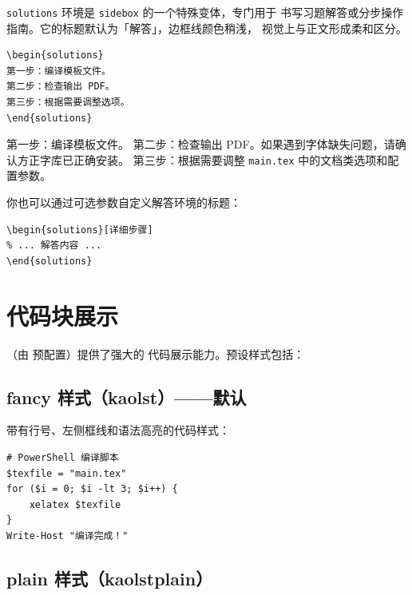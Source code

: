 \texttt{solutions} 环境是 \texttt{sidebox} 的一个特殊变体，专门用于
书写习题解答或分步操作指南。它的标题默认为「解答」，边框线颜色稍浅，
视觉上与正文形成柔和区分。

\begin{lstlisting}
\begin{solutions}
第一步：编译模板文件。
第二步：检查输出 PDF。
第三步：根据需要调整选项。
\end{solutions}
\end{lstlisting}

\begin{solutions}
第一步：编译模板文件。
第二步：检查输出 PDF。如果遇到字体缺失问题，请确认方正字库已正确安装。
第三步：根据需要调整 \texttt{main.tex} 中的文档类选项和配置参数。
\end{solutions}

你也可以通过可选参数自定义解答环境的标题：

\begin{lstlisting}
\begin{solutions}[详细步骤]
% ... 解答内容 ...
\end{solutions}
\end{lstlisting}


\section{代码块展示}


（由  预配置）提供了强大的
代码展示能力。预设样式包括：

\subsection{fancy 样式（kaolst）——默认}

带有行号、左侧框线和语法高亮的代码样式：

\begin{lstlisting}[caption={XeLaTeX 编译脚本示例}, label={lst:build}]
# PowerShell 编译脚本
$texfile = "main.tex"
for ($i = 0; $i -lt 3; $i++) {
    xelatex $texfile
}
Write-Host "编译完成！"
\end{lstlisting}

\subsection{plain 样式（kaolstplain）}

